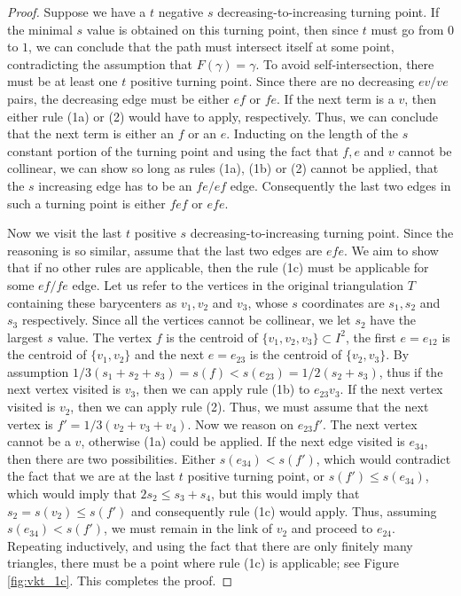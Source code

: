 \begin{proof}
	Suppose we have a $t$ negative $s$ decreasing-to-increasing turning point. If the minimal $s$ value is obtained on this turning point, then since $t$ must go from $0$ to $1$, we can conclude that the path must intersect itself at some point, contradicting the assumption that $F(\gamma)=\gamma$. To avoid self-intersection, there must be at least one $t$ positive turning point. Since there are no decreasing $ev/ve$ pairs, the decreasing edge must be either $ef$ or $fe$. If the next term is a $v$, then either rule (1a) or (2) would have to apply, respectively. Thus, we can conclude that the next term is either an $f$ or an $e$. Inducting on the length of the $s$ constant portion of the turning point and using the fact that $f,e$ and $v$ cannot be collinear, we can show so long as rules (1a), (1b) or (2) cannot be applied, that the $s$ increasing edge has to be an $fe/ef$ edge. Consequently the last two edges in such a turning point is either $fef$ or $efe$.
	
	Now we visit the last $t$ positive $s$ decreasing-to-increasing turning point. Since the reasoning is so similar, assume that the last two edges are $efe$. We aim to show that if no other rules are applicable, then the rule (1c) must be applicable for some $ef/fe$ edge. Let us refer to the vertices in the original triangulation $T$ containing these barycenters as $v_1,v_2$ and $v_3$, whose $s$ coordinates are $s_1,s_2$ and $s_3$ respectively. Since all the vertices cannot be collinear, we let $s_2$ have the largest $s$ value. The vertex $f$ is the centroid of $\{v_1,v_2,v_3\}\subset I^2$, the first $e=e_{12}$ is the centroid of $\{v_1,v_2\}$ and the next $e=e_{23}$ is the centroid of $\{v_2,v_3\}$. By assumption $1/3(s_1+s_2+s_3)=s(f)< s(e_{23})=1/2(s_2+s_3)$, thus if the next vertex visited is $v_3$, then we can apply rule (1b) to $e_{23}v_3$. If the next vertex visited is $v_2$, then we can apply rule (2). Thus, we must assume that the next vertex is $f'=1/3(v_2+v_3+v_4)$. Now we reason on $e_{23}f'$. The next vertex cannot be a $v$, otherwise (1a) could be applied. If the next edge visited is $e_{34}$, then there are two possibilities. Either $s(e_{34})< s(f')$, which would contradict the fact that we are at the last $t$ positive turning point, or $s(f')\leq s(e_{34})$, which would imply that $2s_2\leq s_3+s_4$, but this would imply that $s_2=s(v_2)\leq s(f')$ and consequently rule (1c) would apply. Thus, assuming $s(e_{34})<s(f')$, we must remain in the link of $v_2$ and proceed to $e_{24}$. Repeating inductively, and using the fact that there are only finitely many triangles, there must be a point where rule (1c) is applicable; see Figure \ref{fig:vkt_1c}. This completes the proof.
\end{proof}

